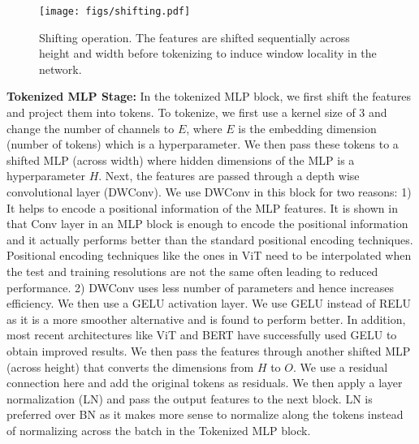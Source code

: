\documentclass[runningheads]{llncs}
\begin{document}
\begin{figure*}[]
	\centering

	\texttt{[image: figs/shifting.pdf]}

	\caption{Shifting operation. The features are shifted sequentially across height and width before tokenizing to induce window locality in the network.   }  
	\label{shift}

\end{figure*}
\noindent \textbf{Tokenized MLP Stage:} In the tokenized MLP block, we first shift the features and project them into tokens. To tokenize, we first use a kernel size of 3 and change the number of channels to $E$, where $E$ is the embedding dimension (number of tokens) which is a hyperparameter. We then pass these tokens to a shifted MLP (across width)  where hidden dimensions of the MLP is a hyperparameter $H$. Next, the features are passed through a depth wise convolutional layer (DWConv). We use DWConv in this block for two reasons: 1) It helps to encode a positional information of the MLP features. It is shown in \cite{xie2021segformer} that Conv layer in an MLP block is enough to encode the positional information and it actually performs better than the standard positional encoding techniques. Positional encoding techniques like the ones in ViT need to be interpolated when the test and training  resolutions are not the same often leading to reduced performance. 2) DWConv uses less number of parameters and hence increases efficiency. We then use a GELU \cite{hendrycks2016gaussian} activation layer. We use GELU instead of RELU as it is a more smoother alternative and is found to perform better.  In addition, most recent architectures like ViT \cite{dosovitskiy2020image} and BERT \cite{devlin2018bert} have successfully used GELU to obtain improved results. We then pass the features through another shifted MLP (across height) that converts the dimensions from $H$ to $O$. We use a residual connection here and add the original tokens as residuals. We then apply a layer normalization (LN) and pass the output features to the next block. LN is preferred over BN as it makes more sense to normalize along the tokens instead of normalizing across the batch in the Tokenized MLP block. 
\end{document}
